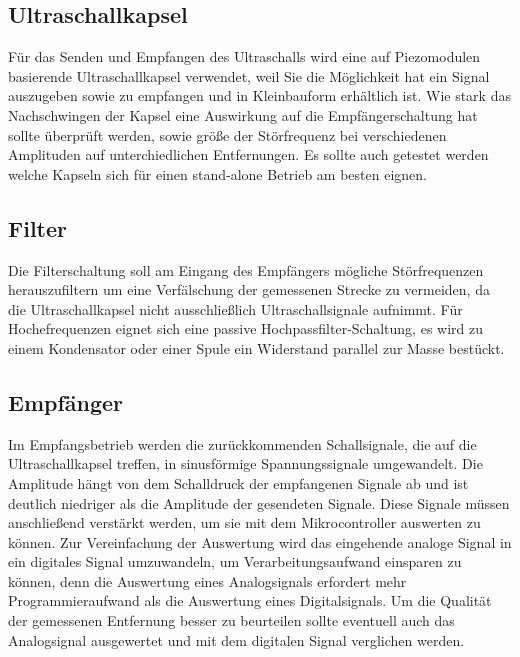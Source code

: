 \subsection{Ultraschallkapsel}
Für das Senden und Empfangen des Ultraschalls wird eine auf Piezomodulen basierende Ultraschallkapsel verwendet, weil Sie die Möglichkeit hat ein Signal auszugeben sowie zu empfangen und in Kleinbauform erhältlich ist. Wie stark das Nachschwingen der Kapsel eine Auswirkung auf die Empfängerschaltung hat sollte überprüft werden, sowie größe der Störfrequenz bei verschiedenen Amplituden auf unterchiedlichen Entfernungen. Es sollte auch getestet werden welche Kapseln sich für einen stand-alone Betrieb am besten eignen.

\subsection{Filter}
Die Filterschaltung soll am Eingang des Empfängers mögliche Störfrequenzen herauszufiltern um eine Verfälschung der gemessenen Strecke zu vermeiden, da die Ultraschallkapsel nicht ausschließlich Ultraschallsignale aufnimmt. Für Hochefrequenzen eignet sich eine passive Hochpassfilter-Schaltung, es wird zu einem Kondensator oder einer Spule ein Widerstand parallel zur Masse bestückt. 

\subsection{Empfänger}
Im Empfangsbetrieb werden die zurückkommenden Schallsignale, die auf die Ultraschallkapsel treffen, in sinusförmige Spannungssignale umgewandelt. Die Amplitude hängt von dem Schalldruck der empfangenen Signale ab und ist deutlich niedriger als die Amplitude der gesendeten Signale. Diese Signale müssen anschließend verstärkt werden, um sie mit dem Mikrocontroller auswerten zu können. Zur Vereinfachung der Auswertung wird das eingehende analoge Signal in ein digitales Signal umzuwandeln, um Verarbeitungsaufwand einsparen zu können, denn die Auswertung eines Analogsignals erfordert mehr Programmieraufwand als die Auswertung eines Digitalsignals. Um die Qualität der gemessenen Entfernung besser zu beurteilen sollte eventuell auch das Analogsignal ausgewertet und mit dem digitalen Signal verglichen werden. 













